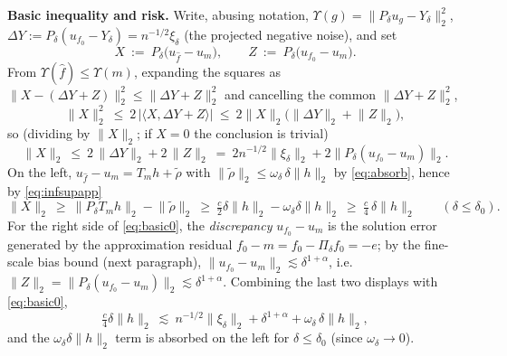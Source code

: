 \documentclass[11pt]{article}
\theoremstyle{remark}
\newcommand{\norm}[1]{\lVert #1\rVert}
\newcommand{\inner}[2]{\langle #1,#2\rangle}
\begin{document}
\par\noindent\textbf{Basic inequality and risk.} Write, abusing notation,
$\Upsilon(g)=\norm{P_\delta u_g-Y_\delta}_2^{2}$,
$\Delta Y:=P_\delta(u_{f_0}-Y_\delta)=n^{-1/2}\xi_\delta$ (the projected
negative noise), and set
\[
X\ :=\ P_\delta\bigl(u_{\widehat f}-u_m\bigr),\qquad
Z\ :=\ P_\delta\bigl(u_{f_0}-u_m\bigr).
\]
From $\Upsilon(\widehat f)\le\Upsilon(m)$, expanding the squares as
$\norm{X-(\Delta Y+Z)}_2^{2}\le\norm{\Delta Y+Z}_2^{2}$ and cancelling
the common $\norm{\Delta Y+Z}_2^{2}$,
\[
\norm{X}_2^{2}\ \le\ 2\,\bigl|\inner{X}{\Delta Y+Z}\bigr|
\ \le\ 2\norm X_2\bigl(\norm{\Delta Y}_2+\norm Z_2\bigr),
\]
so (dividing by $\norm X_2$; if $X=0$ the conclusion is trivial)
\begin{equation}\label{eq:basic0}
\norm{X}_2\ \le\ 2\,\norm{\Delta Y}_2+2\,\norm Z_2
\ =\ 2n^{-1/2}\norm{\xi_\delta}_2+2\norm{P_\delta(u_{f_0}-u_m)}_2 .
\end{equation}
On the left, $u_{\widehat f}-u_m=T_mh+\widetilde\rho$ with
$\norm{\widetilde\rho}_2\le\omega_\delta\,\delta\norm h_2$ by
\eqref{eq:absorb}, hence by \eqref{eq:infsupapp}
\[
\norm{X}_2\ \ge\ \norm{P_\delta T_mh}_2-\norm{\widetilde\rho}_2
\ \ge\ \tfrac c2\delta\norm h_2-\omega_\delta\delta\norm h_2
\ \ge\ \tfrac c4\,\delta\norm h_2
\qquad(\delta\le\delta_0).
\]
For the right side of \eqref{eq:basic0}, the \emph{discrepancy}
$u_{f_0}-u_m$ is the solution error generated by the approximation
residual $f_0-m=f_0-\Pi_\delta f_0=-e$; by the fine-scale bias bound
(next paragraph),
$\norm{u_{f_0}-u_m}_2\lesssim\delta^{1+\alpha}$, i.e.\
$\norm Z_2=\norm{P_\delta(u_{f_0}-u_m)}_2
\lesssim\delta^{1+\alpha}$.
Combining the last two displays with \eqref{eq:basic0},
\begin{equation}\label{eq:basic}
\tfrac{c}{4}\delta\norm{h}_2
\ \lesssim\ n^{-1/2}\norm{\xi_\delta}_2+\delta^{1+\alpha}
+\omega_\delta\,\delta\norm{h}_2 ,
\end{equation}
and the $\omega_\delta\delta\norm{h}_2$ term is absorbed on the left for
$\delta\le\delta_0$ (since $\omega_\delta\to0$).
\end{document}
